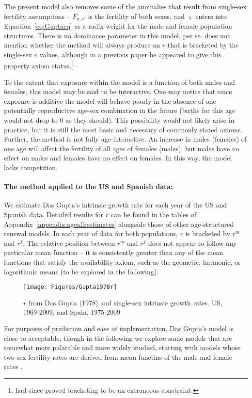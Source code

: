 The present model also removes some of the anomalies that
result from single-sex fertility assumptions -- $F_{a,a'}$ is the fertility of
both sexes, and $\varsigma$ enters into Equation~\eqref{eq:Guptaeq} as a radix
weight for the male and female population structures. There is no dominance
parameter in this model, per se. \citet{gupta1978alternative} does not mention
whether the method will always produce an $r$ that is bracketed by the
single-sex $r$ values, although in a previous paper
\citep{gupta1976interactive} he appeared to give this property axiom
status.\footnote{\citet{yellin1977comparison} had since proved bracketing to be
an extraneous constraint.}
 
 To the extent that exposure within the model is a function of both males and
 females, this model may be said to be interactive. One may notice that since
 exposure is additive the model will behave poorly in the absence of one
 potentially reproductive age-sex combination in the future (births for this
 age would not drop to 0 as they should). This possibility would not likely
 arise in practice, but it is still the most basic and necessary of
 commonly stated axioms. Further, the method is not fully age-interactive. An
 increase in males (females) of one age will affect the fertility of all ages of
 females (males), but males have no effect on males and females have no effect
 on females. In this way, the model lacks competition.

\paragraph{The method applied to the US and Spanish data: } We estimate Das
Gupta's intrinsic growth rate for each year of the US and Spanish data. 
Detailed results for $r$ can be found in the tables of
Appendix~\ref{appendix:ageallrestimates} alongside those of other
age-structured renewal models. In each year of data for both populations, $r$ is
bracketed by $r^m$ and $r^f$. The relative position between $r^m$ and $r^f$ does not appear to follow any
particular mean function -- it is consistently greater than any of the mean
functions that satisfy the availability axiom, such as the geometic, harmonic,
or logorithmic means (to be explored in the following).

\begin{figure}[ht!]
        \centering  
          \caption{$r$ from Das Gupta (1978) and single-sex intrinsic growth rates. US, 1969-2009, and Spain, 1975-2009}
           \texttt{[image: Figures/Gupta1978r]}
          \label{fig:Gupta1978r}
\end{figure}

For purposes of prediction and ease of implementation, Das Gupta's model is
close to acceptable, though in the following we explore some models that
are somewhat more palatable and more widely studied, starting with models whose
two-sex fertility rates are derived from mean functins of the male
and female rates \citep{schoen1981harmonic}.

\FloatBarrier
